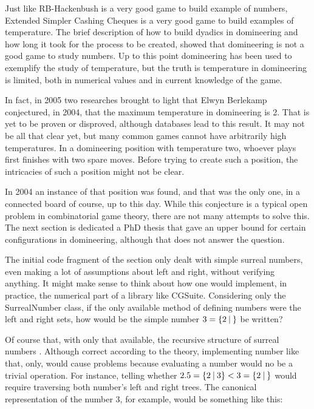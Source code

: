 Just like RB-Hackenbush is a very good game to build example of numbers, Extended Simpler Cashing Cheques is a very good game to build examples of temperature. The brief description of how to build dyadics in domineering and how long it took for the process to be created, showed that domineering is not a good game to study numbers. Up to this point domineering has been used to exemplify the study of temperature, but the truth is temperature in domineering is limited, both in numerical values and in current knowledge of the game.

In fact, in 2005 two researches brought to light that Elwyn Berlekamp conjectured, in 2004, that the maximum temperature in domineering is 2. That is yet to be proven or disproved, although databases lead to this result. It may not be all that clear yet, but many common games cannot have arbitrarily high temperatures. In a domineering position with temperature two, whoever plays first finishes with two spare moves. Before trying to create such a position, the intricacies of such a position might not be clear.

In 2004 an instance of that position was found, and that was the only one, in a connected board of course, up to this day. While this conjecture is a typical open problem in combinatorial game theory, there are not many attempts to solve this. The next section is dedicated a PhD thesis that gave an upper bound for certain configurations in domineering, although that does not answer the question.

The initial code fragment of the section only dealt with simple surreal numbers, even making a lot of assumptions about left and right, without verifying anything. It might make sense to think about how one would implement, in practice, the numerical part of a library like CGSuite. Considering only the SurrealNumber class, if the only available method of defining numbers were the left and right sets, how would be the simple number $3 = \mbox{$\{2\:|\:\}$}$ be written?

Of course that, with only that available, the recursive structure of surreal numbers \gam{\gam{\gam{\gam{}{}}{}}{}}{}. Although correct according to the theory, implementing number like that, only, would cause problems because evaluating a number would no be a trivial operation. For instance, telling whether $2.5 = \mbox{$\{2\:|\:3\}$} < 3 = \mbox{$\{2\:|\:\}$}$ would require traversing both number's left and right trees. The canonical representation of the number 3, for example, would be something like this:

